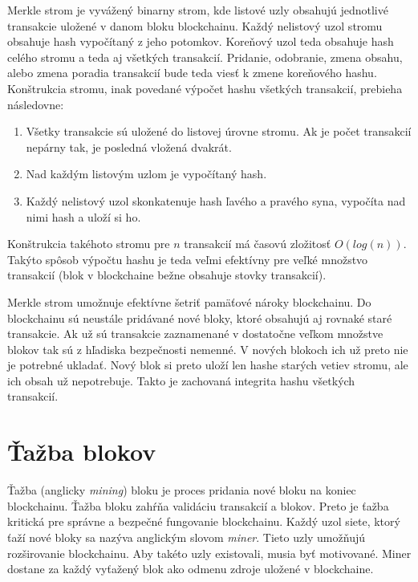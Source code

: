 Merkle strom je vyvážený binarny strom, kde listové uzly obsahujú jednotlivé transakcie uložené v danom bloku blockchainu. Každý nelistový uzol stromu obsahuje hash vypočítaný z jeho potomkov. Koreňový uzol teda obsahuje hash celého stromu a teda aj všetkých transakcií. Pridanie, odobranie, zmena obsahu, alebo zmena poradia transakcií bude teda viesť k zmene koreňového hashu. Konštrukcia stromu, inak povedané výpočet hashu všetkých transakcií, prebieha následovne:
\begin{enumerate}
	\item Všetky transakcie sú uložené do listovej úrovne stromu. Ak je počet transakcií nepárny tak, je posledná vložená dvakrát.
	\item Nad každým listovým uzlom je vypočítaný hash.
	\item Každý nelistový uzol skonkatenuje hash ľavého a pravého syna, vypočíta nad nimi hash a uloží si ho. 
\end{enumerate}
Konštrukcia takéhoto stromu pre $n$ transakcií má časovú zložitosť $O(log(n))$. Takýto spôsob výpočtu hashu je teda veľmi efektívny pre veľké množstvo transakcií (blok v blockchaine bežne obsahuje stovky transakcií).~\cite{merkleTreeBosamia}

Merkle strom umožnuje efektívne šetriť pamäťové nároky blockchainu. Do blockchainu sú neustále pridávané nové bloky, ktoré obsahujú aj rovnaké staré transakcie. Ak už sú transakcie zaznamenané v dostatočne veľkom množstve blokov tak sú z hľadiska bezpečnosti nemenné. V nových blokoch ich už preto nie je potrebné ukladať. Nový blok si preto uloží len hashe starých vetiev stromu, ale ich obsah už nepotrebuje. Takto je zachovaná integrita hashu všetkých transakcií.~\cite{satoshiBitcoin}

\section{Ťažba blokov}\label{sec:mining}

Ťažba (anglicky \textit{mining}) bloku je proces pridania nové bloku na koniec blockchainu. Ťažba bloku zahŕňa validáciu transakcií a blokov. Preto je ťažba kritická pre správne a bezpečné fungovanie blockchainu. Každý uzol siete, ktorý ťaží nové bloky sa nazýva anglickým slovom \textit{miner}. Tieto uzly umožňujú rozširovanie blockchainu. Aby takéto uzly existovali, musia byť motivované. Miner dostane za každý vyťažený blok ako odmenu zdroje uložené v blockchaine.

